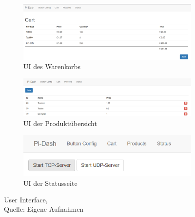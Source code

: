 \begin{figure}[!htb]
  \begin{subfigure}{\linewidth}
	\centering
	\includegraphics[scale=0.4]{Bilder/ui_cart.png}
	\caption[UI des Warenkorbs]{UI des Warenkorbs}
  \end{subfigure}\par\medskip
  \begin{subfigure}{\linewidth}	
	\centering
	\includegraphics[scale=0.4]{Bilder/ui_products.png}
	\caption[UI der Produktübersicht]{UI der Produktübersicht}
  \end{subfigure}\par\medskip
  \begin{subfigure}{\linewidth}
	\centering
	\includegraphics[scale=0.8]{Bilder/ui_status.png}
	\caption[UI der Statusseite]{UI der Statusseite}
  \end{subfigure}
  \caption{User Interface,\\ Quelle: Eigene Aufnahmen}
\end{figure}

